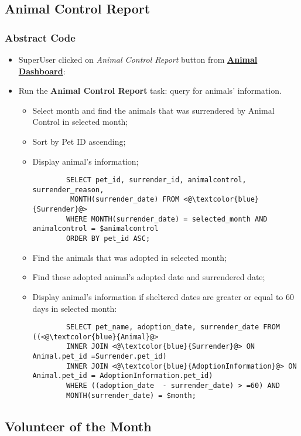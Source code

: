 \documentclass[a4paper]{article}
\begin{document}
\hypertarget{animal_control_report}{\subsection{Animal Control Report}}

\subsubsection*{Abstract Code}

\begin{itemize}
	\item SuperUser clicked on \textit{Animal Control Report} button from \underline{\textbf{Animal Dashboard}}:
	\item Run the \textbf{Animal Control Report} task: query for animals' information.
	\begin{itemize}
		\item Select month and find the animals that was surrendered by Animal Control in selected month;
		\item Sort by Pet ID ascending;
		\item Display animal's information;
		\begin{lstlisting}
		SELECT pet_id, surrender_id, animalcontrol, surrender_reason,
		 MONTH(surrender_date) FROM <@\textcolor{blue}{Surrender}@>
		WHERE MONTH(surrender_date) = selected_month AND animalcontrol = $animalcontrol
		ORDER BY pet_id ASC;
		\end{lstlisting}

		\item Find the animals that was adopted in selected month;
		\item Find these adopted animal's adopted date and surrendered date;
		\item Display animal's information if sheltered dates are greater or equal to 60 days in selected month:
		\begin{lstlisting}
		SELECT pet_name, adoption_date, surrender_date FROM ((<@\textcolor{blue}{Animal}@>
		INNER JOIN <@\textcolor{blue}{Surrender}@> ON Animal.pet_id =Surrender.pet_id)
		INNER JOIN <@\textcolor{blue}{AdoptionInformation}@> ON Animal.pet_id = AdoptionInformation.pet_id)
		WHERE ((adoption_date  - surrender_date) > =60) AND
		MONTH(surrender_date) = $month;
		\end{lstlisting}
	\end{itemize}
\end{itemize}

\hypertarget{volunteer_of_the_month}{\subsection{Volunteer of the Month}}
\end{document}
